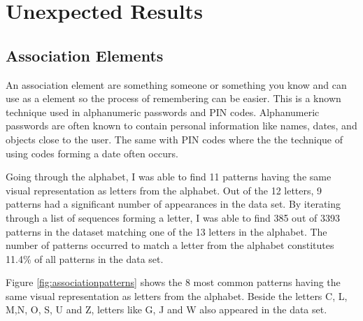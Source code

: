 
\section{Unexpected Results}


\subsection{Association Elements} \label{sec:associationelements}
	An association element are something someone or something you know and can use as a element so the process of remembering can be easier. This is a known technique used in alphanumeric passwords and PIN codes. Alphanumeric passwords are often known to contain personal information like names, dates, and objects close to the user. The same with PIN codes where the the technique of using codes forming a date often occurs. 

  Going through the alphabet, I was able to find 11 patterns having the same visual representation as letters from the alphabet. Out of the 12 letters, 9 patterns had a significant number of appearances in the data set. By iterating through a list of sequences forming a letter, I was able to find 385 out of 3393 patterns in the dataset matching one of the 13 letters in the alphabet. The number of patterns occurred to match a letter from the alphabet constitutes 11.4\% of all patterns in the data set. 

  Figure \ref{fig:associationpatterns} shows the 8 most common patterns having the same visual representation as letters from the alphabet. Beside the letters C, L, M,N, O, S, U and Z, letters like G, J and W also appeared in the data set.

  \clearpage

